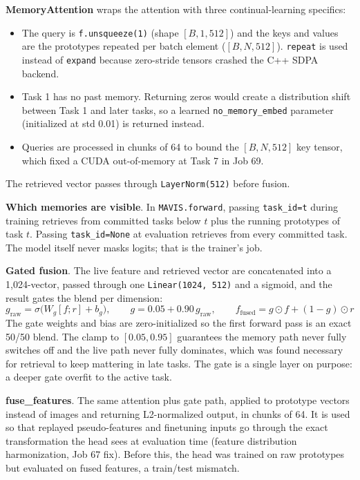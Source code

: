\documentclass[11pt,a4paper]{article}
\newcommand{\code}[1]{\texttt{#1}}
\begin{document}
\textbf{MemoryAttention} wraps the attention with three continual-learning specifics:
\begin{itemize}
  \item The query is \code{f.unsqueeze(1)} (shape $[B, 1, 512]$) and the keys and values are the prototypes repeated per batch element ($[B, N, 512]$). \code{repeat} is used instead of \code{expand} because zero-stride tensors crashed the C++ SDPA backend.
  \item Task 1 has no past memory. Returning zeros would create a distribution shift between Task 1 and later tasks, so a learned \code{no\_memory\_embed} parameter (initialized at std 0.01) is returned instead.
  \item Queries are processed in chunks of 64 to bound the $[B, N, 512]$ key tensor, which fixed a CUDA out-of-memory at Task 7 in Job 69.
\end{itemize}
The retrieved vector passes through \code{LayerNorm(512)} before fusion.

\textbf{Which memories are visible}. In \code{MAVIS.forward}, passing \code{task\_id=t} during training retrieves from committed tasks below $t$ plus the running prototypes of task $t$. Passing \code{task\_id=None} at evaluation retrieves from every committed task. The model itself never masks logits; that is the trainer's job.

\textbf{Gated fusion}. The live feature and retrieved vector are concatenated into a 1{,}024-vector, passed through one \code{Linear(1024, 512)} and a sigmoid, and the result gates the blend per dimension:
\begin{equation}
g_{\mathrm{raw}} = \sigma\big(W_g [f ; r] + b_g\big), \qquad g = 0.05 + 0.90\, g_{\mathrm{raw}}, \qquad f_{\mathrm{fused}} = g \odot f + (1 - g) \odot r
\end{equation}
The gate weights and bias are zero-initialized so the first forward pass is an exact 50/50 blend. The clamp to $[0.05, 0.95]$ guarantees the memory path never fully switches off and the live path never fully dominates, which was found necessary for retrieval to keep mattering in late tasks. The gate is a single layer on purpose: a deeper gate overfit to the active task.

\textbf{fuse\_features}. The same attention plus gate path, applied to prototype vectors instead of images and returning L2-normalized output, in chunks of 64. It is used so that replayed pseudo-features and finetuning inputs go through the exact transformation the head sees at evaluation time (feature distribution harmonization, Job 67 fix). Before this, the head was trained on raw prototypes but evaluated on fused features, a train/test mismatch.
\end{document}
